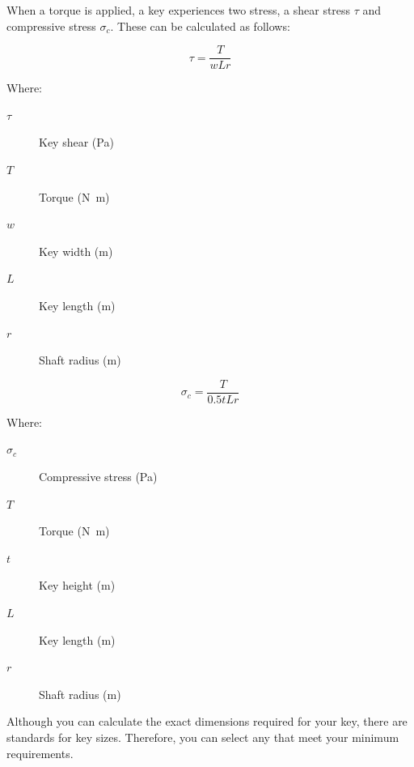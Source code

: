 When a torque is applied, a key experiences two stress, a shear stress \(\tau\) and compressive stress \(\sigma_c\). These can be calculated as follows:


\begin{equation}
  \tau = \frac{T}{wLr}
\end{equation}

\noindent{}Where:

\begin{description}
  \item[\(\tau\)] Key shear (\si{\pascal})
  \item[\(T\)] Torque (\si{\newton\metre})
  \item[\(w\)] Key width (\si{\metre})
  \item[\(L\)] Key length (\si{\metre})
  \item[\(r\)] Shaft radius (\si{\metre})
\end{description}


\begin{equation}
  \sigma_c = \frac{T}{0.5tLr}
\end{equation}

\noindent{}Where:

\begin{description}
  \item[\(\sigma_c\)] Compressive stress (\si{\pascal})
  \item[\(T\)] Torque (\si{\newton\metre})
  \item[\(t\)] Key height (\si{\metre})
  \item[\(L\)] Key length (\si{\metre})
  \item[\(r\)] Shaft radius (\si{\metre})
\end{description}

 Although you can calculate the exact dimensions required for your key, there are standards for key sizes. Therefore, you can select any that meet your minimum requirements.

